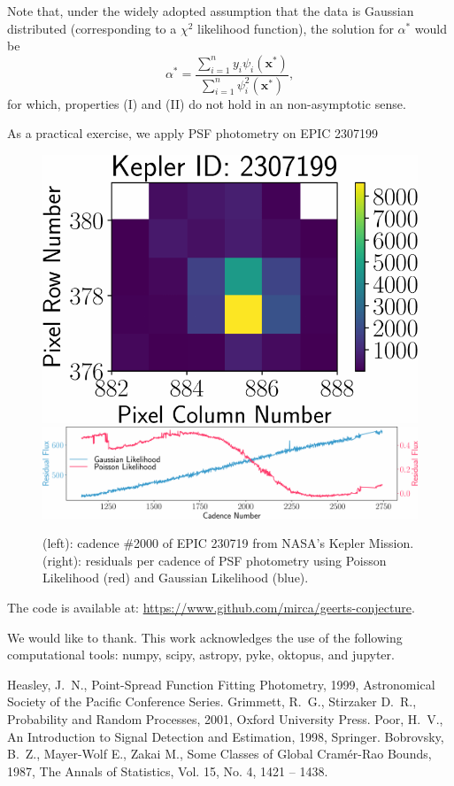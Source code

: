 \documentclass{rnaastex}
\begin{document}
Note that, under the widely adopted assumption that the data is Gaussian distributed (corresponding to a $\chi^2$ likelihood function), the solution for $\alpha^{*}$ would be
\begin{equation}
    \alpha^{*} = \dfrac{\sum_{i=1}^{n}y_i \psi_i(\bm{x}^{*})}{\sum_{i=1}^{n}\psi^2_i(\bm{x}^{*})},
\end{equation}
for which, properties (I) and (II) do not hold in an non-asymptotic sense.

As a practical exercise, we apply PSF photometry on EPIC 2307199
\begin{figure}
    \centering
    \includegraphics[scale=.37]{tpf.pdf}
    \includegraphics[scale=.37]{residuals.pdf}
    \caption{(left): cadence \#2000 of EPIC 230719 from NASA's Kepler Mission. (right): residuals per cadence of PSF photometry using Poisson Likelihood (red) and Gaussian Likelihood (blue).}
\end{figure}

The code is available at: \url{https://www.github.com/mirca/geerts-conjecture}.

\acknowledgments We would like to thank. This work acknowledges the use of the following computational tools: numpy, scipy, astropy, pyke, oktopus, and jupyter.

\begin{thebibliography}{}
     Heasley, J.~N., Point-Spread Function Fitting Photometry, 1999, Astronomical Society of the Pacific Conference Series.
     Grimmett, R.~G., Stirzaker D.~R., Probability and Random Processes, 2001, Oxford University Press.
     Poor, H.~V., An Introduction to Signal Detection and Estimation, 1998, Springer.
     Bobrovsky, B.~Z., Mayer-Wolf E., Zakai M., Some Classes of Global Cram\'er-Rao Bounds, 1987, The Annals of Statistics, Vol. 15, No. 4, 1421 -- 1438.
\end{thebibliography}
\end{document}
